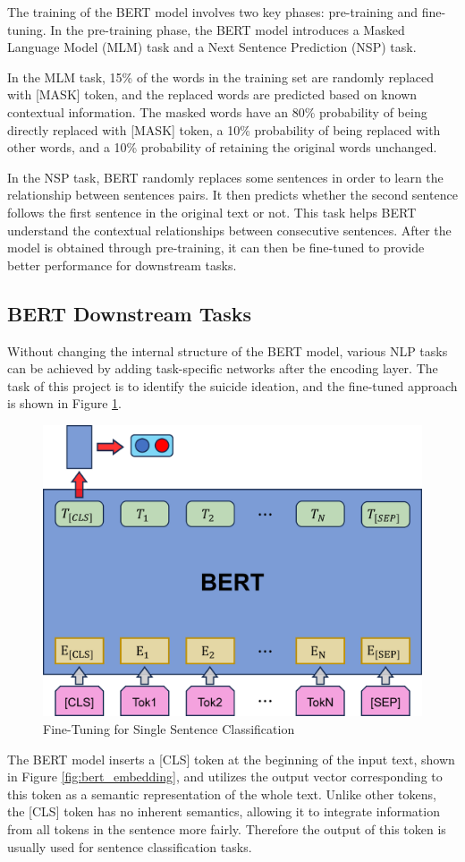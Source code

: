 \documentclass[ %
                    author={Bocheng Wang},
                supervisor={Dr. Qiang Liu},
                    degree={MSc},
                     title={A Research on Identification of Suicide Ideation in Texts with Multiple Models},
                      type={},
                      year={2024}]{dissertation}
\begin{document}
The training of the BERT model involves two key phases: pre-training and fine-tuning. In the pre-training phase, the BERT model introduces a Masked Language Model (MLM) task and a Next Sentence Prediction (NSP) task. 

In the MLM task, 15\% of the words in the training set are randomly replaced with [MASK] token, and the replaced words are predicted based on known contextual information. The masked words have an 80\% probability of being directly replaced with [MASK] token, a 10\% probability of being replaced with other words, and a 10\% probability of retaining the original words unchanged. 

In the NSP task, BERT randomly replaces some sentences in order to learn the relationship between sentences pairs. It then predicts whether the second sentence follows the first sentence in the original text or not. This task helps BERT understand the contextual relationships between consecutive sentences. After the model is obtained through pre-training, it can then be fine-tuned to provide better performance for downstream tasks.

\subsection{BERT Downstream Tasks}
\noindent
Without changing the internal structure of the BERT model, various NLP tasks can be achieved by adding task-specific networks after the encoding layer. The task of this project is to identify the suicide ideation, and the fine-tuned approach is shown in Figure \ref{fig:bfsc}. 

\begin{figure}[h]
      \centering
      \includegraphics[width=0.5\linewidth]{../img/bfsc.eps}
      \caption{Fine-Tuning for Single Sentence Classification}
      \label{fig:bfsc}
\end{figure}

The BERT model inserts a [CLS] token at the beginning of the input text, shown in Figure \ref{fig:bert_embedding}, and utilizes the output vector corresponding to this token as a semantic representation of the whole text. Unlike other tokens, the [CLS] token has no inherent semantics, allowing it to integrate information from all tokens in the sentence more fairly. Therefore the output of this token is usually used for sentence classification tasks.
\end{document}
